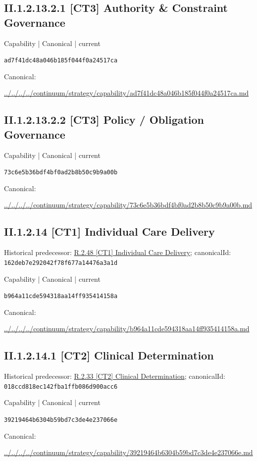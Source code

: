 \documentclass[10pt,a4paper]{article}
\begin{document}
\subsection*{II.1.2.13.2.1 [CT3] Authority \& Constraint Governance}
\label{element-ad7f41dc48a046b185f044f0a24517ca}
{\small Capability | Canonical | current}\par
\texttt{ad7f41dc48a046b185f044f0a24517ca}\par
Canonical: \par
{\footnotesize\url{../../../../continuum/strategy/capability/ad7f41dc48a046b185f044f0a24517ca.md}}\par
\subsection*{II.1.2.13.2.2 [CT3] Policy / Obligation Governance}
\label{element-73c6e5b36bdf4bf0ad2b8b50c9b9a00b}
{\small Capability | Canonical | current}\par
\texttt{73c6e5b36bdf4bf0ad2b8b50c9b9a00b}\par
Canonical: \par
{\footnotesize\url{../../../../continuum/strategy/capability/73c6e5b36bdf4bf0ad2b8b50c9b9a00b.md}}\par
\subsection*{II.1.2.14 [CT1] Individual Care Delivery}
Historical predecessor: \hyperref[element-162deb7e292042f78f677a14476a3a1d]{R.2.48 [CT1] Individual Care Delivery}; canonicalId: \texttt{162deb7e292042f78f677a14476a3a1d}\par
\label{element-b964a11cde594318aa14ff935414158a}
{\small Capability | Canonical | current}\par
\texttt{b964a11cde594318aa14ff935414158a}\par
Canonical: \par
{\footnotesize\url{../../../../continuum/strategy/capability/b964a11cde594318aa14ff935414158a.md}}\par
\subsection*{II.1.2.14.1 [CT2] Clinical Determination}
Historical predecessor: \hyperref[element-018ccd818ec142fba1ffb086d900acc6]{R.2.33 [CT2] Clinical Determination}; canonicalId: \texttt{018ccd818ec142fba1ffb086d900acc6}\par
\label{element-39219464b6304b59bd7c3de4e237066e}
{\small Capability | Canonical | current}\par
\texttt{39219464b6304b59bd7c3de4e237066e}\par
Canonical: \par
{\footnotesize\url{../../../../continuum/strategy/capability/39219464b6304b59bd7c3de4e237066e.md}}\par
\end{document}
